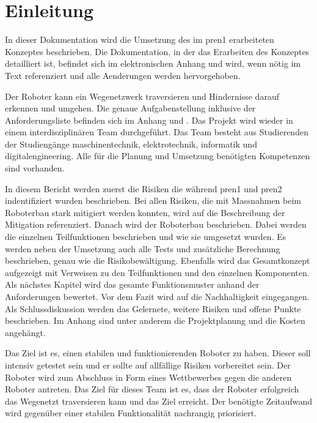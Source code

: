 \section{Einleitung}

In dieser Dokumentation wird die Umsetzung des im \acrfull{pren1} erarbeiteten Konzeptes beschrieben. 
Die Dokumentation, in der das Erarbeiten des Konzeptes detailliert ist, befindet sich im elektronischen Anhang und wird, wenn nötig im Text referenziert und alle Aenderungen werden hervorgehoben.

Der Roboter kann ein Wegenetzwerk traversieren und Hindernisse darauf erkennen und umgehen. Die genaue Aufgabenstellung inklusive der Anforderungsliste befinden sich im Anhang  und . Das Projekt wird wieder in einem interdisziplinären Team durchgeführt. Das Team besteht aus Studierenden der Studiengänge \acrfull{maschinentechnik}, \acrfull{elektrotechnik}, \acrfull{informatik} und \acrfull{digitalengineering}. Alle für die Planung und Umsetzung benötigten Kompetenzen sind vorhanden.

In diesem Bericht werden zuerst die Risiken die während \acrshort{pren1} und \acrshort{pren2} indentifiziert wurden beschrieben. Bei allen Risiken, die mit Massnahmen beim Roboterbau stark mitigiert werden konnten, wird auf die Beschreibung der Mitigation referenziert. Danach wird der Roboterbau beschrieben. Dabei werden die einzelnen Teilfunktionen beschrieben und wie sie umgesetzt wurden. Es werden neben der Umsetzung auch alle Tests und zusätzliche Berechnung beschrieben, genau wie die Risikobewältigung. Ebenfalls wird das Gesamtkonzept aufgezeigt mit Verweisen zu den Teilfunktionen und den einzelnen Komponenten. Als nächstes Kapitel wird das gesamte Funktionsmuster anhand der Anforderungen bewertet. Vor dem Fazit wird auf die Nachhaltigkeit eingegangen. Als Schlussdiskussion werden das Gelernete, weitere Risiken und offene Punkte beschrieben. Im Anhang sind unter anderem die Projektplanung und die Kosten angehängt.


Das Ziel ist es, einen stabilen und funktionierenden Roboter zu haben. Dieser soll intensiv getestet sein und er sollte auf allfällige Risiken vorbereitet sein. Der Roboter wird zum Abschluss in Form eines Wettbewerbes gegen die anderen Roboter antreten. Das Ziel für dieses Team ist es, dass der Roboter erfolgreich das Wegenetzt traversieren kann und das Ziel erreicht. Der benötigte Zeitaufwand wird gegenüber einer stabilen Funktionalität nachrangig priorisiert.
